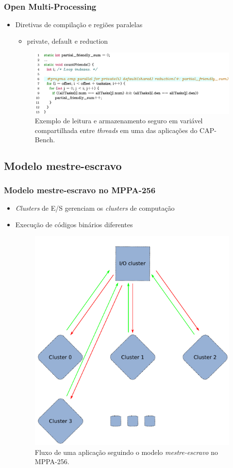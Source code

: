 \documentclass[xcolor={table}]{beamer}
\begin{document}
\begin{frame}\frametitle{Open Multi-Processing}
    \begin{itemize}
        \item Diretivas de compilação e regiões paralelas
        \begin{itemize}
            \item private, default e reduction
        \end{itemize}
        \begin{figure}[tb]
          \centering
          \includegraphics[width=1\linewidth, keepaspectratio]{figs/reductionloop.png}
          \caption{Exemplo de leitura e armazenamento seguro em variável compartilhada entre \textit{threads} em uma das aplicações do CAP-Bench.}
          \label{lst:reductionloop}
        \end{figure}
    \end{itemize}
\end{frame}

\subsection{Modelo mestre-escravo}
\begin{frame}\frametitle{Modelo mestre-escravo no MPPA-256}
    \begin{itemize}
        \item \textit{Clusters} de E/S gerenciam os \textit{clusters} de computação
        \item Execução de códigos binários diferentes
        \begin{figure}[tb]
          \centering
          \includegraphics[width=.5\linewidth, keepaspectratio]{figs/mppamasterslave.pdf}
          \caption{Fluxo de uma aplicação seguindo o modelo \textit{mestre-escravo} no MPPA-256.}
          \label{fig:masterslave}
        \end{figure}
    \end{itemize}
\end{frame}
\end{document}
